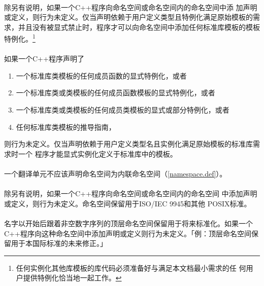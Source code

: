 \paragraph{}
除另有说明，如果一个C++程序向命名空间或命名空间内的命名空间中添
加声明或定义，则行为未定义。仅当声明依赖于用户定义类型且特例化满足原始模板的需
求，并且没有被显式禁止时，程序才可以向命名空间中添加任何标准库模板的模板
特例化。\footnote{任何实例化其他库模板的库代码必须准备好与满足本文档最小需求的任
何用户提供特例化恰当地一起工作。}

\paragraph{}
如果一个C++程序声明了
\begin{enumerate}
  \item{一个标准库类模板的任何成员函数的显式特例化，或者}
  \item{一个标准库类或类模板的任何成员函数模板的显式特例化，或者}
  \item{一个标准库类或类模板的任何成员类模板的显式或部分特例化，或者}
  \item{任何标准库类模板的推导指南，}
\end{enumerate}
则行为未定义。仅当声明依赖于用户定义类型名且实例化满足原始模板的标准库需求时一个
程序才能显式实例化定义于标准库中的模板。

\paragraph{}
一个翻译单元不应该声明命名空间为内联命名空间（\ref{namespace.def}）。

\paragraph{}
除另有说明，如果一个C++程序向命名空间或命名空间内的命名空间
中添加声明或定义，则行为未定义。命名空间保留用于ISO/IEC 9945和其他
POSIX标准。

\paragraph{}
名字以开始后跟着非空数字序列的顶层命名空间保留用于将来标准化。如果一个
C++程序向这种命名空间中添加声明或定义则行为未定义。「例：顶层命名空间保
留用于本国际标准的未来修正。」

